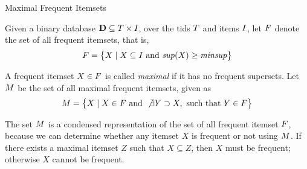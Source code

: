 
\date{Chapter 9: Summarizing Itemsets}

\begin{frame}
\titlepage
\end{frame}


\newcommand{\alggenmax}{\textsc{GenMax}\xspace}
\newcommand{\algcharm}{\textsc{Charm}\xspace}
\newcommand{\algndi}{\textsc{NDI}\xspace}
\newcommand{\algcomputebounds}{\textsc{ComputeBounds}\xspace}


\begin{frame}{Maximal Frequent Itemsets}

Given a binary database $\mathbf{D} \subseteq {\relax T} \times {\relax I}$,
over the tids ${\relax T}$ and items ${\relax I}$, let ${\relax F}$
denote the set of all frequent itemsets, that is,
\begin{align*}
{\relax F} = \bigl\{X \mid X \subseteq {\relax I} \mbox{ and } \mathit{sup}(X) \ge \mathit{minsup}
\bigr\}
\end{align*}

\medskip
A frequent itemset $X \in {\relax F}$ is called {\em maximal}
if it has no
frequent supersets. Let ${\relax M}$ be the set of all maximal frequent
itemsets, given as
\begin{align*}
{\relax M} = \bigl\{X \mid X \in {\relax F} \mbox{ and } \not\exists Y \supset X, \mbox{
  such that } Y \in {\relax F} \bigr\}
\end{align*}

\medskip
The set ${\relax M}$ is a condensed representation of the set of all frequent
itemset ${\relax F}$, because we can determine whether any itemset $X$ is
frequent or not using ${\relax M}$. If there exists a maximal itemset $Z$ such
that $X \subseteq Z$, then $X$ must be frequent; otherwise $X$ cannot be
frequent. 
\end{frame}


